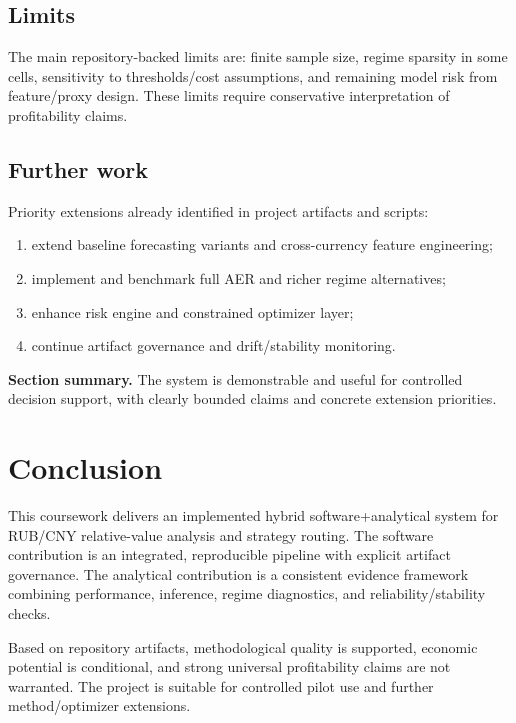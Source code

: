 \documentclass[a4paper,12pt]{extarticle}
\begin{document}
\subsection{Limits}

The main repository-backed limits are: finite sample size, regime sparsity in some cells, sensitivity to thresholds/cost assumptions, and remaining model risk from feature/proxy design. These limits require conservative interpretation of profitability claims.

\subsection{Further work}

Priority extensions already identified in project artifacts and scripts:
\begin{enumerate}[leftmargin=*, itemsep=0.4em]
    \item extend baseline forecasting variants and cross-currency feature engineering;
    \item implement and benchmark full AER and richer regime alternatives;
    \item enhance risk engine and constrained optimizer layer;
    \item continue artifact governance and drift/stability monitoring.
\end{enumerate}

\textbf{Section summary.} The system is demonstrable and useful for controlled decision support, with clearly bounded claims and concrete extension priorities.

\section{Conclusion}

This coursework delivers an implemented hybrid software+analytical system for RUB/CNY relative-value analysis and strategy routing. The software contribution is an integrated, reproducible pipeline with explicit artifact governance. The analytical contribution is a consistent evidence framework combining performance, inference, regime diagnostics, and reliability/stability checks.

Based on repository artifacts, methodological quality is supported, economic potential is conditional, and strong universal profitability claims are not warranted. The project is suitable for controlled pilot use and further method/optimizer extensions.
\end{document}
